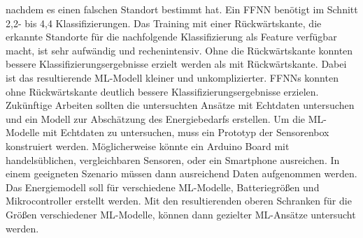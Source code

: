 nachdem es einen falschen Standort bestimmt hat.
Ein FFNN benötigt im Schnitt 2,2- bis 4,4 Klassifizierungen.
\newline
\newline
Das Training mit einer Rückwärtskante, die erkannte Standorte für die nachfolgende Klassifizierung als Feature verfügbar macht, ist sehr aufwändig und rechenintensiv.
Ohne die Rückwärtskante konnten bessere Klassifizierungsergebnisse erzielt werden als mit Rückwärtskante.
Dabei ist das resultierende ML-Modell kleiner und unkomplizierter.
FFNNs konnten ohne Rückwärtskante deutlich bessere Klassifizierungsergebnisse erzielen.
\newline
\newline
Zukünftige Arbeiten sollten die untersuchten Ansätze mit Echtdaten untersuchen und ein Modell zur Abschätzung des Energiebedarfs erstellen.
Um die ML-Modelle mit Echtdaten zu untersuchen, muss ein Prototyp der Sensorenbox konstruiert werden.
Möglicherweise könnte ein Arduino Board mit handelsüblichen, vergleichbaren Sensoren, oder ein Smartphone ausreichen.
In einem geeigneten Szenario müssen dann ausreichend Daten aufgenommen werden.
\newline
\newline
Das Energiemodell soll für verschiedene ML-Modelle, Batteriegrößen und Mikrocontroller erstellt werden.
Mit den resultierenden oberen Schranken für die Größen verschiedener ML-Modelle,
können dann gezielter ML-Ansätze untersucht werden.